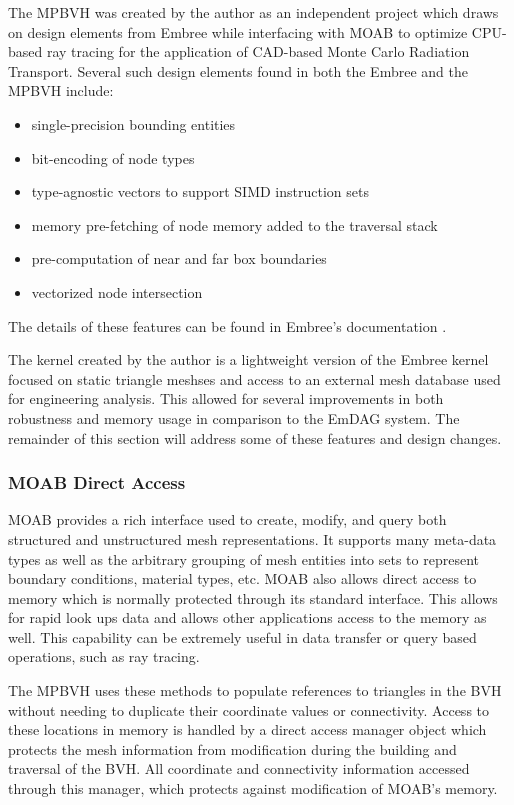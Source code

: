 The MPBVH was created by the author as an independent project which draws on
design elements from Embree while interfacing with MOAB to optimize CPU-based
ray tracing for the application of CAD-based Monte Carlo Radiation
Transport. Several such design elements found in both the Embree and the MPBVH
include:

\begin{itemize}
  \item single-precision bounding entities
  \item bit-encoding of node types
  \item type-agnostic vectors to support SIMD instruction sets
  \item memory pre-fetching of node memory added to the traversal stack
  \item pre-computation of near and far box boundaries
  \item vectorized node intersection
\end{itemize}

The details of these features can be found in Embree's documentation
\cite{Embree}.

The kernel created by the author is a lightweight version of the
Embree kernel focused on static triangle meshses and access to an external mesh
database used for engineering analysis. This allowed for several improvements in
both robustness and memory usage in comparison to the EmDAG system. The
remainder of this section will address some of these features and design
changes.

\subsubsection{MOAB Direct Access}

MOAB provides a rich interface used to create, modify, and query both structured
and unstructured mesh representations. It supports many meta-data types as well as
the arbitrary grouping of mesh entities into sets to represent boundary
conditions, material types, etc. MOAB also allows direct access to memory which
is normally protected through its standard interface. This allows for rapid look
ups data and allows other applications access to the memory as well. This
capability can be extremely useful in data transfer or query based operations,
such as ray tracing.

The MPBVH uses these methods to populate references to triangles in
the BVH without needing to duplicate their coordinate values or
connectivity. Access to these locations in memory is handled by a direct access
manager object which protects the mesh information from modification during the
building and traversal of the BVH. All coordinate and connectivity information
accessed through this manager, which protects against modification of MOAB's
memory.

